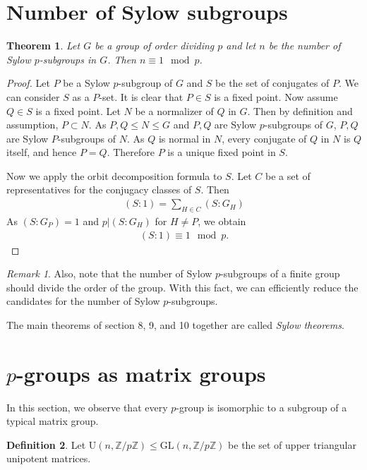 \documentclass[12pt]{report}
\theoremstyle{plain}
\newtheorem{theorem}{Theorem}[section]
\theoremstyle{remark}
\newtheorem*{remark}{Remark}
\theoremstyle{definition}
\newtheorem{definition}[theorem]{Definition}
\newcommand{\Z}{\mathbb{Z}}
\begin{document}
\section{Number of Sylow subgroups}
\begin{theorem}
    Let $G$ be a group of order dividing $p$ and let $n$ be the number of Sylow $p$-subgroups in $G$. Then $n\equiv 1 \mod p$.
\end{theorem}
\begin{proof}
    Let $P$ be a Sylow $p$-subgroup of $G$ and $S$ be the set of conjugates of $P$. We can consider $S$ as a $P$-set. It is clear that $P\in S$ is a fixed point. Now assume $Q\in S$ is a fixed point. Let $N$ be a normalizer of $Q$ in $G$. Then by definition and assumption, $P\subset N$. As $P,Q\le N\le G$ and $P,Q$ are Sylow $p$-subgroups of $G$, $P,Q$ are Sylow $P$-subgroups of $N$. As $Q$ is normal in $N$, every conjugate of $Q$ in $N$ is $Q$ itself, and hence $P=Q$. Therefore $P$ is a unique fixed point in $S$.

    Now we apply the orbit decomposition formula to $S$. Let $C$ be a set of representatives for the conjugacy classes of $S$. Then
    \begin{align*}
        (S:1) = \sum_{H\in C} (S:G_H)
    \end{align*}
    As $(S:G_P) = 1$ and $p|(S:G_H)$ for $H\neq P$, we obtain
    \begin{align*}
        (S:1)\equiv 1\mod p.
    \end{align*}
\end{proof}
\begin{remark}
    Also, note that the number of Sylow $p$-subgroups of a finite group should divide the order of the group. With this fact, we can efficiently reduce the candidates for the number of Sylow $p$-subgroups.
\end{remark}

The main theorems of section 8, 9, and 10 together are called \emph{Sylow theorems}.


\section{\texorpdfstring{$p$-groups as matrix groups}{p-groups as matrix groups}}

In this section, we observe that every $p$-group is isomorphic to a subgroup of a typical matrix group.

\begin{definition}
    Let $\mathrm{U}(n,\Z/p\Z)\le \mathrm{GL}(n,\Z/p\Z)$ be the set of upper triangular unipotent matrices.
\end{definition}
\end{document}
